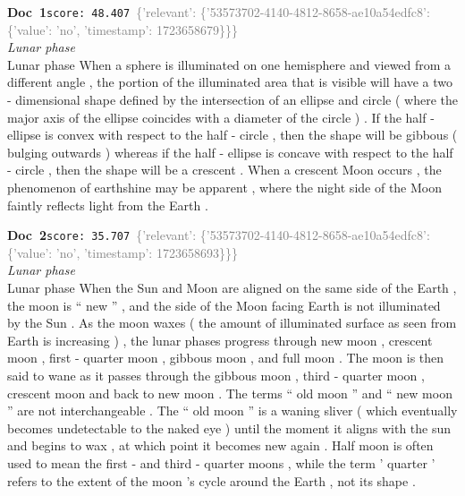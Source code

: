 \documentclass[a4paper,11pt]{article}
\begin{document}
\begin{docenv}
{\footnotesize\textcolor{doccolor}{\textbf{Doc~1}}}\hfill{\tiny\texttt{score:~48.407}}\ {\tiny\textcolor{gray}{\{'relevant': \{'53573702-4140-4812-8658-ae10a54edfc8': \{'value': 'no', 'timestamp': 1723658679\}\}\}}}\\[3pt]
{\small\textit{Lunar phase}}\\[2pt]
\vspace{2pt}
{\footnotesize Lunar phase
When a sphere is illuminated on one hemisphere and viewed from a different angle , the portion of the illuminated area that is visible will have a two - dimensional shape defined by the intersection of an ellipse and circle ( where the major axis of the ellipse coincides with a diameter of the circle ) . If the half - ellipse is convex with respect to the half - circle , then the shape will be gibbous ( bulging outwards ) whereas if the half - ellipse is concave with respect to the half - circle , then the shape will be a crescent . When a crescent Moon occurs , the phenomenon of earthshine may be apparent , where the night side of the Moon faintly reflects light from the Earth .}
\end{docenv}
\begin{docenv}
{\footnotesize\textcolor{doccolor}{\textbf{Doc~2}}}\hfill{\tiny\texttt{score:~35.707}}\ {\tiny\textcolor{gray}{\{'relevant': \{'53573702-4140-4812-8658-ae10a54edfc8': \{'value': 'no', 'timestamp': 1723658693\}\}\}}}\\[3pt]
{\small\textit{Lunar phase}}\\[2pt]
\vspace{2pt}
{\footnotesize Lunar phase
When the Sun and Moon are aligned on the same side of the Earth , the moon is `` new '' , and the side of the Moon facing Earth is not illuminated by the Sun . As the moon waxes ( the amount of illuminated surface as seen from Earth is increasing ) , the lunar phases progress through new moon , crescent moon , first - quarter moon , gibbous moon , and full moon . The moon is then said to wane as it passes through the gibbous moon , third - quarter moon , crescent moon and back to new moon . The terms `` old moon '' and `` new moon '' are not interchangeable . The `` old moon '' is a waning sliver ( which eventually becomes undetectable to the naked eye ) until the moment it aligns with the sun and begins to wax , at which point it becomes new again . Half moon is often used to mean the first - and third - quarter moons , while the term ' quarter ' refers to the extent of the moon 's cycle around the Earth , not its shape .}
\end{docenv}
\end{document}
